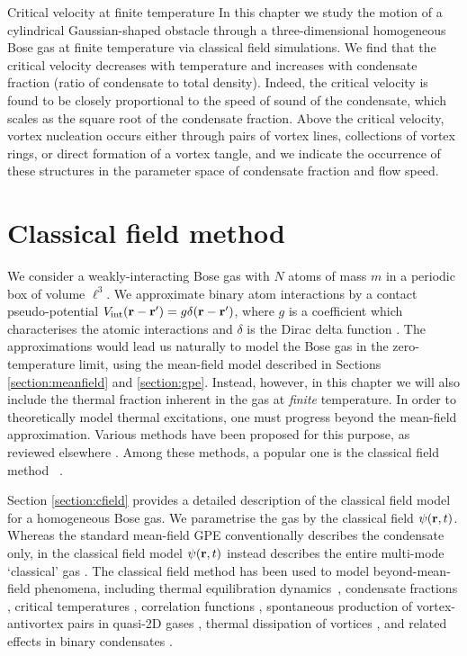 \begin{chapter}{\label{cha:nonequib}Critical velocity at finite temperature}
In this chapter we study the motion of a cylindrical Gaussian-shaped
obstacle through a three-dimensional homogeneous Bose gas at finite
temperature via classical field simulations. We
find that the critical velocity decreases with temperature and
increases with condensate fraction (ratio of condensate to total density).
Indeed, the critical velocity is found to be closely proportional
to the speed of sound of the condensate, which scales as the square
root of the condensate fraction. Above
the critical velocity, vortex nucleation occurs either through
pairs of vortex lines, collections of vortex rings, or direct formation of a vortex tangle, and we indicate the occurrence of these structures in the parameter space of condensate fraction and flow speed.

  \section{Classical field method}
\label{sec:theory}

We consider a weakly-interacting Bose gas with $N$ atoms of mass $m$ in a periodic box of volume $\ell^3$.  We approximate binary atom interactions by a contact pseudo-potential $V_{\mathrm{int}}({\bf r}-{\bf r'})= g \delta({\bf r}-{\bf r'})$, where $g$ is a coefficient which characterises the atomic interactions and $\delta$ is the Dirac delta function \cite{Pethick}. The approximations would lead us naturally to model the Bose gas in the zero-temperature limit, using the mean-field model described in Sections \ref{section:meanfield} and \ref{section:gpe}. Instead, however, in this chapter we will also include the thermal fraction inherent in the gas at {\it finite} temperature. In order to theoretically model thermal excitations, one must progress beyond the mean-field approximation.
Various methods have been proposed for this purpose, as reviewed elsewhere
\cite{Pol_Rev,Proukakis,griffin2009bose,finite_temp_book,Blakie,berloff_2014}.
Among these methods, a popular one is the classical field method ~\cite{Svis5,Davis,PRL.87.210404,
PhysRevA.66.013603,Davis2,PhysRevLett.95.263901,Pol_Rev}.

Section \ref{section:cfield} provides a detailed description of the classical field model for a homogeneous Bose gas. We parametrise the gas by the classical field $\psi({\bf r},t)$. Whereas the standard mean-field GPE conventionally describes the condensate only, in the classical field model $\psi({\bf r},t)$ instead describes the entire multi-mode `classical' gas \cite{Proukakis,Blakie}.  The classical field method has been used to model beyond-mean-field phenomena, including thermal equilibration dynamics~\cite{PhysRevA.66.013603,PhysRevLett.95.263901,pattinson_2014,nazarenko_2014}, condensate fractions \cite{Davis}, critical temperatures \cite{Davis2006}, correlation functions \cite{Wright2011}, spontaneous production of vortex-antivortex pairs in quasi-2D gases \cite{Simula}, thermal dissipation of vortices \cite{berloff_2007},  and related effects in binary condensates \cite{Berloff_2006,Salman20091482,pattinson_2014}.


\end{chapter}

